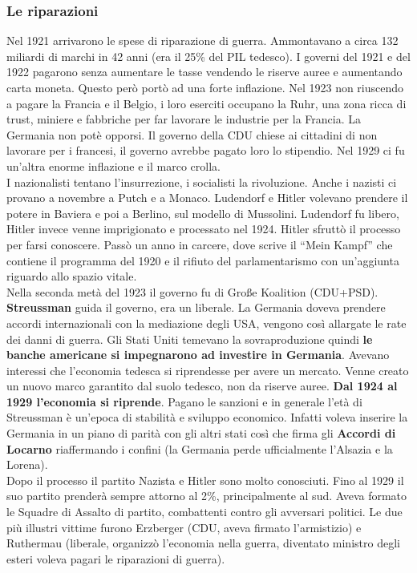 \subsubsection{Le riparazioni}
Nel 1921 arrivarono le spese di riparazione di guerra. Ammontavano a circa 132 miliardi di marchi in
42 anni (era il 25\% del PIL tedesco). I governi del 1921 e del 1922 pagarono senza aumentare le 
tasse vendendo le riserve auree e aumentando carta moneta. Questo però portò ad una forte inflazione.
Nel 1923 non riuscendo a pagare la Francia e il Belgio, i loro eserciti occupano la Ruhr, una zona
ricca di trust, miniere e fabbriche per far lavorare le industrie per la Francia. La Germania non
potè opporsi. Il governo della CDU chiese ai cittadini di non lavorare per i francesi, il governo
avrebbe pagato loro lo stipendio. Nel 1929 ci fu un'altra enorme inflazione e il marco crolla.\\
I nazionalisti tentano l'insurrezione, i socialisti la rivoluzione. Anche i nazisti ci provano
a novembre a Putch e a Monaco. Ludendorf e Hitler volevano prendere il potere in Baviera e poi a 
Berlino, sul modello di Mussolini. Ludendorf fu libero, Hitler invece venne imprigionato e processato
nel 1924. Hitler sfruttò il processo per farsi conoscere. Passò un anno in carcere, dove scrive il
``Mein Kampf'' che contiene il programma del 1920 e il rifiuto del parlamentarismo con un'aggiunta 
riguardo allo spazio vitale.\\ [\baselineskip]
Nella seconda metà del 1923 il governo fu di Gro{\ss}e Koalition (CDU+PSD). \textbf{Streussman} guida
il governo, era un liberale. La Germania doveva prendere accordi internazionali con la mediazione
degli USA, vengono così allargate le rate dei danni di guerra. Gli Stati Uniti temevano la
sovraproduzione quindi \textbf{le banche americane si impegnarono ad investire in Germania}. Avevano 
interessi che l'economia tedesca si riprendesse per avere un mercato. Venne creato un nuovo marco
garantito dal suolo tedesco, non da riserve auree. \textbf{Dal 1924 al 1929 l'economia si riprende}.
Pagano le sanzioni e in generale l'età di Streussman è un'epoca di stabilità e sviluppo economico.
Infatti voleva inserire la Germania in un piano di parità con gli altri stati così che firma gli
\textbf{Accordi di Locarno} riaffermando i confini (la Germania perde ufficialmente l'Alsazia e la 
Lorena).\\ [\baselineskip]
Dopo il processo il partito Nazista e Hitler sono molto conosciuti. Fino al 1929 il suo partito
prenderà sempre attorno al 2\%, principalmente al sud. Aveva formato le Squadre di Assalto di 
partito, combattenti contro gli avversari politici. Le due più illustri vittime furono Erzberger 
(CDU, aveva firmato l'armistizio) e Ruthermau (liberale, organizzò l'economia nella guerra, diventato
ministro degli esteri voleva pagari le riparazioni di guerra).

